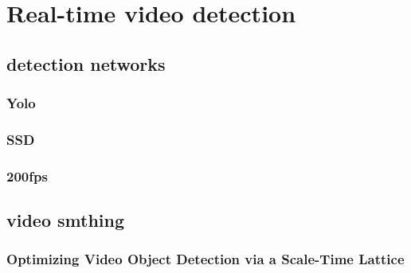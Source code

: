 
\chapter{Real-time video detection}
\label{chap:rltm}

\section{detection networks}
\subsection{Yolo}

\subsection{SSD}

\subsection{200fps}

\section{video smthing}
\subsection{Optimizing Video Object Detection via a Scale-Time Lattice}